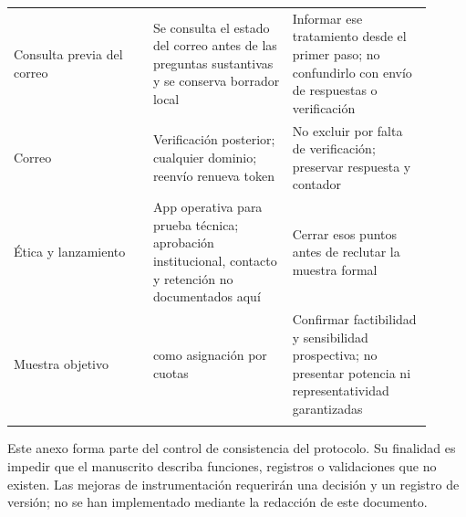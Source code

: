 \documentclass[12pt,letterpaper]{article}
\begin{document}
\begin{longtable}{>{\raggedright\arraybackslash}p{0.303\linewidth}>{\raggedright\arraybackslash}p{0.303\linewidth}>{\raggedright\arraybackslash}p{0.303\linewidth}}
Consulta previa del correo & Se consulta el estado del correo antes de las preguntas sustantivas y se conserva borrador local & Informar ese tratamiento desde el primer paso; no confundirlo con envío de respuestas o verificación \\ \addlinespace[5pt]
Correo & Verificación posterior; cualquier dominio; reenvío renueva token & No excluir por falta de verificación; preservar respuesta y contador \\ \addlinespace[5pt]
Ética y lanzamiento & App operativa para prueba técnica; aprobación institucional, contacto y retención no documentados aquí & Cerrar esos puntos antes de reclutar la muestra formal \\ \addlinespace[5pt]
Muestra objetivo & 2.800 como asignación por cuotas & Confirmar factibilidad y sensibilidad prospectiva; no presentar potencia ni representatividad garantizadas \\ \addlinespace[5pt]
\bottomrule\end{longtable}\endgroup
Este anexo forma parte del control de consistencia del protocolo. Su finalidad es impedir que el manuscrito describa funciones, registros o validaciones que no existen. Las mejoras de instrumentación requerirán una decisión y un registro de versión; no se han implementado mediante la redacción de este documento.
\end{document}
